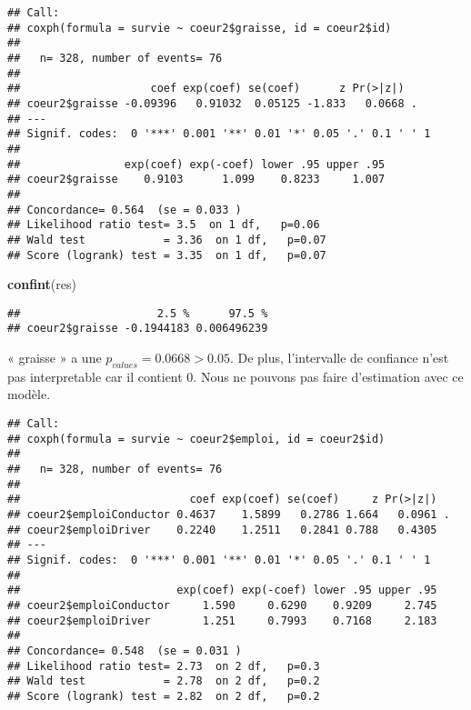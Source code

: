 \documentclass[
]{article}
\newenvironment{Shaded}{\begin{snugshade}}{\end{snugshade}}
\newcommand{\DataTypeTok}[1]{\textcolor[rgb]{0.13,0.29,0.53}{#1}}
\newcommand{\KeywordTok}[1]{\textcolor[rgb]{0.13,0.29,0.53}{\textbf{#1}}}
\newcommand{\NormalTok}[1]{#1}
\newcommand{\OperatorTok}[1]{\textcolor[rgb]{0.81,0.36,0.00}{\textbf{#1}}}
\begin{document}
\begin{verbatim}
## Call:
## coxph(formula = survie ~ coeur2$graisse, id = coeur2$id)
## 
##   n= 328, number of events= 76 
## 
##                    coef exp(coef) se(coef)      z Pr(>|z|)  
## coeur2$graisse -0.09396   0.91032  0.05125 -1.833   0.0668 .
## ---
## Signif. codes:  0 '***' 0.001 '**' 0.01 '*' 0.05 '.' 0.1 ' ' 1
## 
##                exp(coef) exp(-coef) lower .95 upper .95
## coeur2$graisse    0.9103      1.099    0.8233     1.007
## 
## Concordance= 0.564  (se = 0.033 )
## Likelihood ratio test= 3.5  on 1 df,   p=0.06
## Wald test            = 3.36  on 1 df,   p=0.07
## Score (logrank) test = 3.35  on 1 df,   p=0.07
\end{verbatim}

\begin{Shaded}
\begin{Highlighting}[]
\KeywordTok{confint}\NormalTok{(res)}
\end{Highlighting}
\end{Shaded}

\begin{verbatim}
##                     2.5 %      97.5 %
## coeur2$graisse -0.1944183 0.006496239
\end{verbatim}

« graisse » a une \(p_{values}= 0.0668> 0.05\). De plus, l'intervalle de
confiance n'est pas interpretable car il contient 0. Nous ne pouvons pas
faire d'estimation avec ce modèle.

\begin{Shaded}
\end{Shaded}

\begin{verbatim}
## Call:
## coxph(formula = survie ~ coeur2$emploi, id = coeur2$id)
## 
##   n= 328, number of events= 76 
## 
##                          coef exp(coef) se(coef)     z Pr(>|z|)  
## coeur2$emploiConductor 0.4637    1.5899   0.2786 1.664   0.0961 .
## coeur2$emploiDriver    0.2240    1.2511   0.2841 0.788   0.4305  
## ---
## Signif. codes:  0 '***' 0.001 '**' 0.01 '*' 0.05 '.' 0.1 ' ' 1
## 
##                        exp(coef) exp(-coef) lower .95 upper .95
## coeur2$emploiConductor     1.590     0.6290    0.9209     2.745
## coeur2$emploiDriver        1.251     0.7993    0.7168     2.183
## 
## Concordance= 0.548  (se = 0.031 )
## Likelihood ratio test= 2.73  on 2 df,   p=0.3
## Wald test            = 2.78  on 2 df,   p=0.2
## Score (logrank) test = 2.82  on 2 df,   p=0.2
\end{verbatim}
\end{document}

